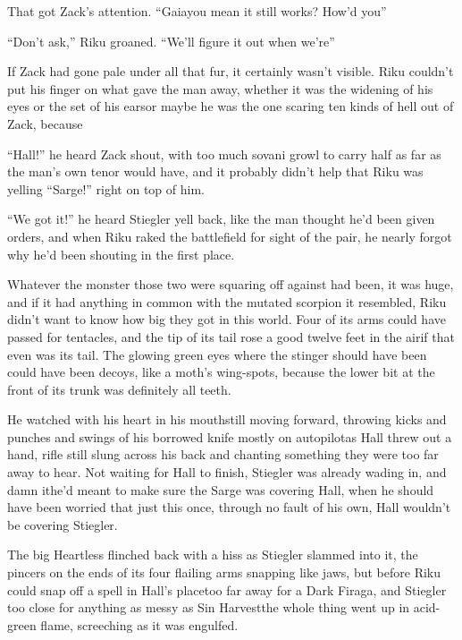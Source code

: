 That got Zack's attention. ``Gaia\textemdash you mean it still works? How'd you\textemdash''

``Don't ask,'' Riku groaned. ``We'll figure it out when we're\textemdash''

If Zack had gone pale under all that fur, it certainly wasn't visible. Riku couldn't put his finger on what gave the man away, whether it was the widening of his eyes or the set of his ears\textemdash or maybe he was the one scaring ten kinds of hell out of Zack, because\textemdash 

``Hall!'' he heard Zack shout, with too much sovani growl to carry half as far as the man's own tenor would have, and it probably didn't help that Riku was yelling ``Sarge!'' right on top of him.

``We got it!'' he heard Stiegler yell back, like the man thought he'd been given orders, and when Riku raked the battlefield for sight of the pair, he nearly forgot why he'd been shouting in the first place.

Whatever the monster those two were squaring off against had been, it was huge, and if it had anything in common with the mutated scorpion it resembled, Riku didn't want to know how big they got in this world. Four of its arms could have passed for tentacles, and the tip of its tail rose a good twelve feet in the air\textemdash if that even was its tail. The glowing green eyes where the stinger should have been could have been decoys, like a moth's wing-spots, because the lower bit at the front of its trunk was definitely all teeth.

He watched with his heart in his mouth\textemdash still moving forward, throwing kicks and punches and swings of his borrowed knife mostly on autopilot\textemdash as Hall threw out a hand, rifle still slung across his back and chanting something they were too far away to hear. Not waiting for Hall to finish, Stiegler was already wading in, and damn it\textemdash he'd meant to make sure the Sarge was covering Hall, when he should have been worried that just this once, through no fault of his own, Hall wouldn't be covering Stiegler.

The big Heartless flinched back with a hiss as Stiegler slammed into it, the pincers on the ends of its four flailing arms snapping like jaws, but before Riku could snap off a spell in Hall's place\textemdash too far away for a Dark Firaga, and Stiegler too close for anything as messy as Sin Harvest\textemdash the whole thing went up in acid-green flame, screeching as it was engulfed.

